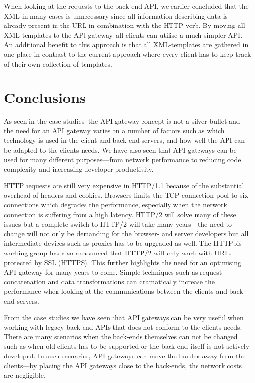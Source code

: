 \documentclass{cslthse-msc}
\begin{document}
When looking at the requests to the back-end API, we earlier concluded that the XML in many cases is unnecessary since all information describing data is already present in the URL in combination with the HTTP verb. By moving all XML-templates to the API gateway, all clients can utilise a much simpler API. An additional benefit to this approach is that all XML-templates are gathered in one place in contrast to the current approach where every client has to keep track of their own collection of templates.

\chapter{Conclusions}
As seen in the case studies, the API gateway concept is not a silver bullet and the need for an API gateway varies on a number of factors such as which technology is used in the client and back-end servers, and how well the API can be adapted to the clients needs. We have also seen that API gateways can be used for many different purposes---from network performance to reducing code complexity and increasing developer productivity.

HTTP requests are still very expensive in HTTP/1.1 because of the substantial overhead of headers and cookies. Browsers limits the TCP connection pool to six connections which degrades the performance, especially when the network connection is suffering from a high latency. HTTP/2 will solve many of these issues but a complete switch to HTTP/2 will take many years---the need to change will not only be demanding for the browser- and server developers but all intermediate devices such as proxies has to be upgraded as well. The HTTPbis working group has also announced that HTTP/2 will only work with URLs protected by SSL (HTTPS)\cite{http2_ssl}. This further highlights the need for an optimising API gateway for many years to come. Simple techniques such as request concatenation and data transformations can dramatically increase the performance when looking at the communications between the clients and back-end servers.

From the case studies we have seen that API gateways can be very useful when working with legacy back-end APIs that does not conform to the clients needs. There are many scenarios when the back-ends themselves can not be changed such as when old clients has to be supported or the back-end itself is not actively developed. In such scenarios, API gateways can move the burden away from the clients---by placing the API gateways close to the back-ends, the network costs are negligible. 
\end{document}
